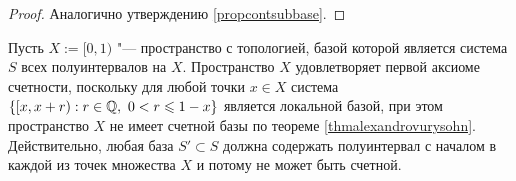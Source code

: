 \begin{proof}
    Аналогично утверждению \ref{propcontsubbase}.
\end{proof}

\begin{example}
    Пусть $X := [0, 1)$ "--- пространство с топологией, базой которой является система $S$ всех полуинтервалов на $X$. Пространство $X$ удовлетворяет первой аксиоме счетности, поскольку для любой точки $x \in X$ система $\{[x, x+r): r \in \mathbb{Q},~0 < r \leqslant 1 - x\}$ является локальной базой, при этом пространство $X$ не имеет счетной базы по теореме \ref{thmalexandrovurysohn}. Действительно, любая база $S' \subset S$ должна содержать полуинтервал с началом в каждой из точек множества $X$ и потому не может быть счетной.
\end{example}